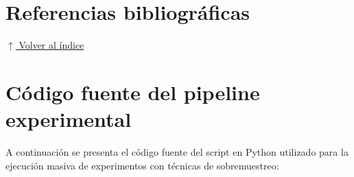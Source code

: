 \documentclass[12pt,a4paper]{article}
\begin{document}
\section{Referencias bibliográficas} \noindent\hyperlink{toc}{\small$\uparrow$ Volver al índice}
\printbibliography

\appendix

\section{Código fuente del pipeline experimental}
\label{apendice:codigo_pipeline}

A continuación se presenta el código fuente del script en Python utilizado para la ejecución masiva de experimentos con técnicas de sobremuestreo:


\end{document}
